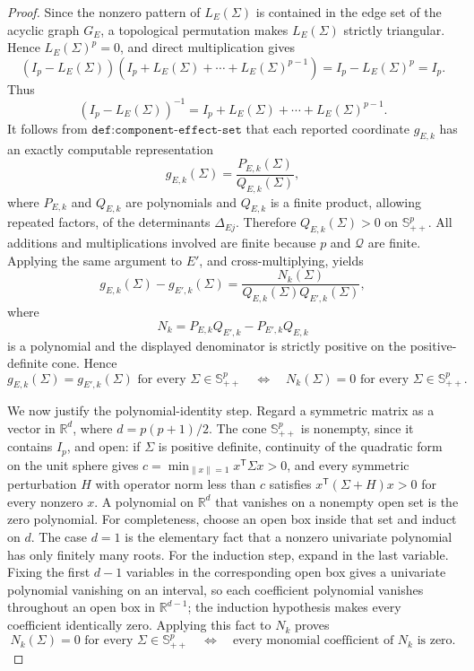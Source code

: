 \documentclass{article}
\begin{document}
\begin{proof}
Since the nonzero pattern of \(L_E(\Sigma)\) is contained in the edge set of the acyclic graph \(G_E\), a topological permutation makes \(L_E(\Sigma)\) strictly triangular.  Hence \(L_E(\Sigma)^p=0\), and direct multiplication gives
\[
 (I_p-L_E(\Sigma))
 \left(I_p+L_E(\Sigma)+\cdots+L_E(\Sigma)^{p-1}\right)
 =I_p-L_E(\Sigma)^p=I_p.
\]
Thus
\[
 (I_p-L_E(\Sigma))^{-1}
 =I_p+L_E(\Sigma)+\cdots+L_E(\Sigma)^{p-1}.
\]
It follows from \(\texttt{def:component-effect-set}\) that each reported coordinate \(g_{E,k}\) has an exactly computable representation
\[
 g_{E,k}(\Sigma)=\frac{P_{E,k}(\Sigma)}{Q_{E,k}(\Sigma)},
\]
where \(P_{E,k}\) and \(Q_{E,k}\) are polynomials and \(Q_{E,k}\) is a finite product, allowing repeated factors, of the determinants \(\Delta_{Ej}\).  Therefore \(Q_{E,k}(\Sigma)>0\) on \(\mathbb S^p_{++}\).  All additions and multiplications involved are finite because \(p\) and \(\mathcal Q\) are finite.  Applying the same argument to \(E'\), and cross-multiplying, yields
\[
 g_{E,k}(\Sigma)-g_{E',k}(\Sigma)
 =\frac{N_k(\Sigma)}{Q_{E,k}(\Sigma)Q_{E',k}(\Sigma)},
\]
where
\[
 N_k=P_{E,k}Q_{E',k}-P_{E',k}Q_{E,k}
\]
is a polynomial and the displayed denominator is strictly positive on the positive-definite cone.  Hence
\[
 g_{E,k}(\Sigma)=g_{E',k}(\Sigma)
 \text{ for every }\Sigma\in\mathbb S^p_{++}
 \quad\Longleftrightarrow\quad
 N_k(\Sigma)=0
 \text{ for every }\Sigma\in\mathbb S^p_{++}.
\]

We now justify the polynomial-identity step.  Regard a symmetric matrix as a vector in \(\mathbb R^d\), where \(d=p(p+1)/2\).  The cone \(\mathbb S^p_{++}\) is nonempty, since it contains \(I_p\), and open: if \(\Sigma\) is positive definite, continuity of the quadratic form on the unit sphere gives \(c=\min_{\lVert x\rVert=1}x^{\mathsf T}\Sigma x>0\), and every symmetric perturbation \(H\) with operator norm less than \(c\) satisfies \(x^{\mathsf T}(\Sigma+H)x>0\) for every nonzero \(x\).  A polynomial on \(\mathbb R^d\) that vanishes on a nonempty open set is the zero polynomial.  For completeness, choose an open box inside that set and induct on \(d\).  The case \(d=1\) is the elementary fact that a nonzero univariate polynomial has only finitely many roots.  For the induction step, expand in the last variable.  Fixing the first \(d-1\) variables in the corresponding open box gives a univariate polynomial vanishing on an interval, so each coefficient polynomial vanishes throughout an open box in \(\mathbb R^{d-1}\); the induction hypothesis makes every coefficient identically zero.  Applying this fact to \(N_k\) proves
\[
 N_k(\Sigma)=0
 \text{ for every }\Sigma\in\mathbb S^p_{++}
 \quad\Longleftrightarrow\quad
 \text{every monomial coefficient of }N_k\text{ is zero}.
\]


\end{proof}
\end{document}
